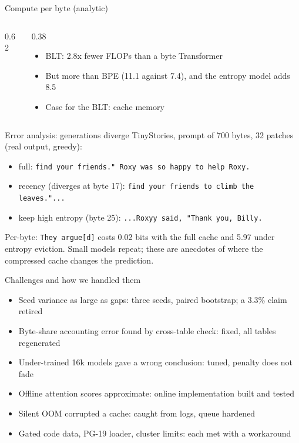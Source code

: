 \documentclass[aspectratio=169,10pt]{beamer}
\begin{document}
\begin{frame}{Compute per byte (analytic)}
\begin{columns}[T]
\begin{column}{0.62\textwidth}\centering\footnotesize\resizebox{\textwidth}{!}{}\end{column}
\begin{column}{0.38\textwidth}\begin{itemize}\small\setlength{\itemsep}{3pt}
\item BLT: 2.8x fewer FLOPs than a byte Transformer
\item But more than BPE (11.1 against 7.4), and the entropy model adds 8.5
\item Case for the BLT: cache memory
\end{itemize}\end{column}
\end{columns}
\end{frame}

\begin{frame}{Error analysis: generations diverge}
\footnotesize TinyStories, prompt of 700 bytes, 32 patches (real output, greedy):
\begin{itemize}\setlength{\itemsep}{3pt}
\item full: \texttt{find your friends."  Roxy was so happy to help Roxy.}
\item recency (diverges at byte 17): \texttt{find your friends to climb the leaves."...}
\item keep high entropy (byte 25): \texttt{...Roxyy said, "Thank you, Billy.}
\end{itemize}
Per-byte: \texttt{They argue[d]} costs 0.02 bits with the full cache and 5.97 under entropy eviction. Small models repeat; these are anecdotes of where the compressed cache changes the prediction.
\end{frame}

\begin{frame}{Challenges and how we handled them}
\small
\begin{itemize}\setlength{\itemsep}{3pt}
\item Seed variance as large as gaps: three seeds, paired bootstrap; a 3.3\% claim retired
\item Byte-share accounting error found by cross-table check: fixed, all tables regenerated
\item Under-trained 16k models gave a wrong conclusion: tuned, penalty does not fade
\item Offline attention scores approximate: online implementation built and tested
\item Silent OOM corrupted a cache: caught from logs, queue hardened
\item Gated code data, PG-19 loader, cluster limits: each met with a workaround
\end{itemize}
\end{frame}
\end{document}
